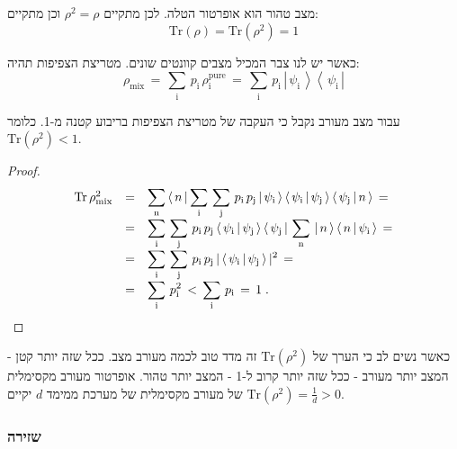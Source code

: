 \documentclass{tstextbook}
\begin{document}
\begin{proposition}
מצב טהור הוא אופרטור הטלה. לכן מתקיים \(\rho^{2}=\rho\) וכן מתקיים:
$$\mathrm{Tr}\left( \rho \right)=\mathrm{Tr}\left( \rho^{2} \right)=1$$

\end{proposition}
\begin{proposition}
כאשר יש לנו צבר המכיל מצבים קוונטים שונים. מטריצת הצפיפות תהיה:
$$\rho_{\mathrm{mix}}\,=\,\sum_{\mathrm{i}}\,p_{\mathrm{i}}\,\rho_{\mathrm{i}}^{\mathrm{pure}}\,=\,\sum_{\mathrm{i}}\,p_{\mathrm{i}}\,\left|\,\psi_{\mathrm{i}}\,\right>\left<\,\psi_{\mathrm{i}}\,\right|$$

\end{proposition}
\begin{proposition}
עבור מצב מעורב נקבל כי העקבה של מטריצת הצפיפות בריבוע קטנה מ-1. כלומר \(\mathrm{Tr}\left( \rho^{2} \right)<1\).

\end{proposition}
\begin{proof}
$$\begin{array}{r c l}{{\mathrm{Tr}\,\rho_{\mathrm{mix}}^{2}}}&{{=}}&{{\displaystyle\sum_{\mathrm{n}}\,\langle\,n\,|\sum_{\mathrm{i}}\,\sum_{\mathrm{j}}\,p_{\mathrm{i}}\,p_{\mathrm{j}}\,|\,\psi_{\mathrm{i}}\,\rangle\,\langle\,\psi_{\mathrm{i}}\,|\,\psi_{\mathrm{j}}\,\rangle\,\langle\,\psi_{\mathrm{j}}\,|\,n\,\rangle\,=}}\\ {{}}&{{=}}&{{\displaystyle\sum_{\mathrm{i}}\,\sum_{\mathrm{j}}\,p_{\mathrm{i}}\,p_{\mathrm{j}}\,\langle\,\psi_{\mathrm{i}}\,|\,\psi_{\mathrm{j}}\,\rangle\,\langle\,\psi_{\mathrm{j}}\,|\,\sum_{\mathrm{n}}\,|\,n\,\rangle\,\langle\,n\,|\,\psi_{\mathrm{i}}\,\rangle\,=}}\\ {{}}&{{=}}&{{\displaystyle\sum_{\mathrm{i}}\,\sum_{\mathrm{j}}\,p_{\mathrm{i}}\,p_{\mathrm{j}}\,|\,\langle\,\psi_{\mathrm{i}}\,|\,\psi_{\mathrm{j}}\,\rangle\,|^{2}\,=}}\\ {{}}&{{=}}&{{\displaystyle\sum_{\mathrm{i}}\,p_{\mathrm{i}}^{2}\,<\,\sum_{\mathrm{i}}\,p_{\mathrm{i}}\,=\,1\;.}}\end{array}$$

\end{proof}
כאשר נשים לב כי הערך של \(\mathrm{Tr}\left( \rho^{2} \right)\) זה מדד טוב לכמה מעורב מצב. ככל שזה יותר קטן - המצב יותר מעורב - ככל שזה יותר קרוב ל-1 - המצב יותר טהור. אופרטור מעורב מקסימלית של מעורב מקסימלית של מערכת ממימד \(d\) יקיים \(\mathrm{Tr}\left( \rho^{2} \right)=\frac{1}{d}>0\).

\subsubsection{שזירה}
\end{document}
